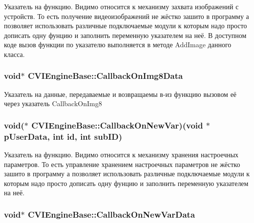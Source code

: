 Указатель на функцию. Видимо относится к механизму захвата изображений с устройств. То есть получение видеоизображений не жёстко зашито в программу а позволяет использовать различные подключаемые модули к которым надо просто дописать одну фунцию и заполнить переменную указателем на неё. В доступном коде вызов функции по указателю выполняется в методе Add\+Image данного класса. 

\hypertarget{class_c_v_i_engine_base_abfaf1ec8dec9a82c896a90c708dfd756}{
\subsubsection[{Callback\+On\+Img8\+Data}]{\setlength{\rightskip}{0pt plus 5cm}void$\ast$ C\+V\+I\+Engine\+Base\+::\+Callback\+On\+Img8\+Data}}\label{class_c_v_i_engine_base_abfaf1ec8dec9a82c896a90c708dfd756}


Указатель на данные, передаваемые и возвращаемы в-\/из функцию вызовом её через указатель Callback\+On\+Img8 

\hypertarget{class_c_v_i_engine_base_ab3883b66e78478803c693b4ad2f5b0e7}{
\subsubsection[{Callback\+On\+New\+Var}]{\setlength{\rightskip}{0pt plus 5cm}void($\ast$ C\+V\+I\+Engine\+Base\+::\+Callback\+On\+New\+Var)(void $\ast$p\+User\+Data, int id, int sub\+I\+D)}}\label{class_c_v_i_engine_base_ab3883b66e78478803c693b4ad2f5b0e7}


Указатель на функцию. Видимо относится к механизму хранения настроечных параметров. То есть управление хранением настроечных параметров не жёстко зашито в программу а позволяет использовать различные подключаемые модули к которым надо просто дописать одну фунцию и заполнить переменную указателем на неё. 

\hypertarget{class_c_v_i_engine_base_aa0d4e70811444be165a4b9c2a4aa7aae}{
\subsubsection[{Callback\+On\+New\+Var\+Data}]{\setlength{\rightskip}{0pt plus 5cm}void$\ast$ C\+V\+I\+Engine\+Base\+::\+Callback\+On\+New\+Var\+Data}}\label{class_c_v_i_engine_base_aa0d4e70811444be165a4b9c2a4aa7aae}


